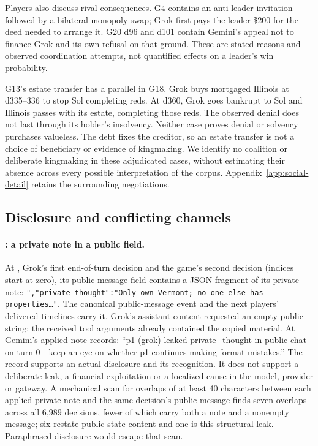 Players also discuss rival consequences. G4 contains an anti-leader invitation followed by a bilateral monopoly swap; Grok first pays the leader \$200 for the deed needed to arrange it. G20 d96 and d101 contain Gemini's appeal not to finance Grok and its own refusal on that ground. These are stated reasons and observed coordination attempts, not quantified effects on a leader's win probability.

G13's estate transfer has a parallel in G18. Grok buys mortgaged Illinois at d335--336 to stop Sol completing reds. At d360, Grok goes bankrupt to Sol and Illinois passes with its estate, completing those reds. The observed denial does not last through its holder's insolvency. Neither case proves denial or solvency purchases valueless. The debt fixes the creditor, so an estate transfer is not a choice of beneficiary or evidence of kingmaking. We identify no coalition or deliberate kingmaking in these adjudicated cases, without estimating their absence across every possible interpretation of the corpus. Appendix~\ref{app:social-detail} retains the surrounding negotiations.

\subsection{Disclosure and conflicting channels}\label{sec:conduct-channels}

\paragraph{: a private note in a public field.}
At , Grok's first end-of-turn decision and the game's second decision (indices start at zero), its public message field contains a JSON fragment of its private note: \texttt{",\allowbreak "private\_thought":\allowbreak "Only own Vermont; no one else has properties\ldots"}. The canonical public-message event and the next players' delivered timelines carry it. Grok's assistant content requested an empty public string; the received tool arguments already contained the copied material. At  Gemini's applied note records: ``p1 (grok) leaked private\_thought in public chat on turn 0---keep an eye on whether p1 continues making format mistakes.'' The record supports an actual disclosure and its recognition. It does not support a deliberate leak, a financial exploitation or a localized cause in the model, provider or gateway. A mechanical scan for overlaps of at least 40 characters between each applied private note and the same decision's public message finds seven overlaps across all 6,989 decisions, fewer of which carry both a note and a nonempty message; six restate public-state content and one is this structural leak. Paraphrased disclosure would escape that scan.

